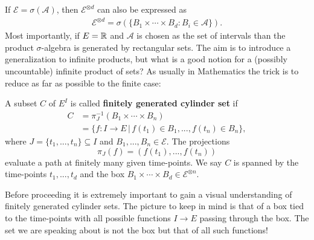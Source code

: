 If $\mathcal E=\sigma(\mathcal A)$, then $\mathcal E^{\otimes d}$ can also be expressed as
\begin{align*}
	\mathcal E^{\otimes d}=\sigma(\{B_1\times \cdots \times B_d: B_i\in \mathcal A\}).
\end{align*}
Most importantly, if $E=\mathbb{R}$ and $\mathcal A$ is chosen as the set of intervals than the product $\sigma$-algebra is generated by rectangular sets. The aim is to introduce a generalization to infinite products, but what is a good notion for a (possibly uncountable) infinite product of sets?
As usually in Mathematics the trick is to reduce as far as possible to the finite case:
\begin{ldef}
	\begin{deff}
		A subset $C$ of $E^I$ is called \textbf{finitely generated cylinder set} if 
		\begin{align*}
			C&=\pi_{J}^{-1}(B_1\times \cdots \times B_n)\\
			&=\{f:I\to E\,|\, f(t_1)\in B_1, ..., f(t_n)\in B_n\},
		\end{align*}
		where $J=\{t_1,...,t_n\}\subseteq I$ and $B_1,...,B_n\in \mathcal E$. The projections $$\pi_{J}(f)=(f(t_1),...,f(t_n))$$ evaluate a path at finitely many given time-points. We say $C$ is spanned by the time-points $t_1,...,t_d$ and the box $B_1\times \cdots \times B_d \in \mathcal E^{\otimes n}$.	
	\end{deff}
\end{ldef}
Before proceeding it is extremely important to gain a visual understanding of  finitely generated cylinder sets. The picture to keep in mind is that of a box tied to the time-points with all possible functions $I\to E$ passing through the box. The set we are speaking about is not the box but that of all such functions!


